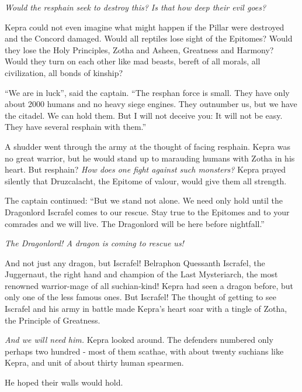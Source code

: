 \documentclass
  [a4paper,
   12pt,
   oneside
  ]%
  {article}
\begin{document}
\emph{Would the resphain seek to destroy this? Is that how deep their evil goes?}

Kepra could not even imagine what might happen if the Pillar were destroyed and the Concord damaged. Would all reptiles lose sight of the Epitomes? Would they lose the Holy Principles, Zotha and Asheen, Greatness and Harmony? Would they turn on each other like mad beasts, bereft of all morals, all civilization, all bonds of kinship?

``We are in luck'', said the captain. ``The resphan force is small. They have only about 2000 humans and no heavy siege engines. They outnumber us, but we have the citadel. We can hold them. But I will not deceive you: It will not be easy. They have several resphain with them.'' 

A shudder went through the army at the thought of facing resphain. Kepra was no great warrior, but he would stand up to marauding humans with Zotha in his heart. 
But resphain? \emph{How does one fight against such monsters?}
Kepra prayed silently that Druzcalacht, the Epitome of valour, would give them all strength.

The captain continued: ``But we stand not alone. We need only hold until the Dragonlord Iscrafel comes to our rescue. Stay true to the Epitomes and to your comrades and we will live. The Dragonlord will be here before nightfall.''

\emph{The Dragonlord! A dragon is coming to rescue us!} 

And not just any dragon, but Iscrafel! Belraphon Quessanth Iscrafel, the Juggernaut, the right hand and champion of the Last Mysteriarch, the most renowned warrior-mage of all suchian-kind! Kepra had seen a dragon before, but only one of the less famous ones.
But Iscrafel! The thought of getting to see Iscrafel and his army in battle made Kepra's heart soar with a tingle of Zotha, the Principle of Greatness.

\emph{And we will need him.} Kepra looked around. The defenders numbered only perhaps two hundred - most of them scathae, with about twenty suchians like Kepra, and unit of about thirty human spearmen.

He hoped their walls would hold. 

\end{document}
